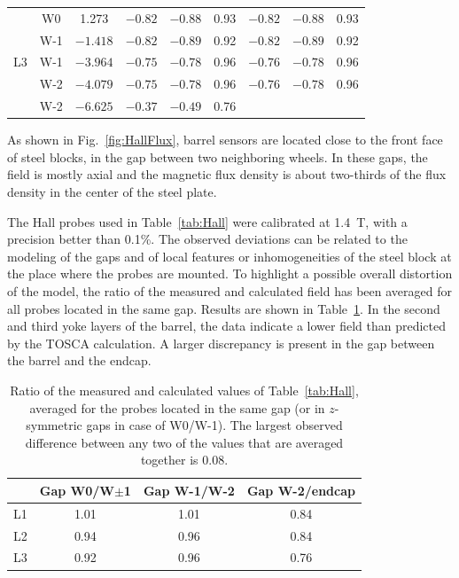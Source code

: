 \begin{table}
\begin{center}
\begin{tabular}{cc|c|ccc|ccc}
\hline
\multirow{5}{*}{L3}
& W0  &  1.273   & $-0.82$ & $-0.88$ & 0.93 & $-0.82$ & $-0.88$ & 0.93 \\
& W-1 & $-1.418$ & $-0.82$ & $-0.89$ & 0.92 & $-0.82$ & $-0.89$ & 0.92 \\
& W-1 & $-3.964$ & $-0.75$ & $-0.78$ & 0.96 & $-0.76$ & $-0.78$ & 0.96 \\
& W-2 & $-4.079$ & $-0.75$ & $-0.78$ & 0.96 & $-0.76$ & $-0.78$ & 0.96 \\
& W-2 & $-6.625$ & $-0.37$ & $-0.49$ & 0.76 & & & \\
\hline

\end{tabular}
\end{center}
\end{table}
As shown in Fig.~\ref{fig:HallFlux}, barrel sensors are located close to
the front face of steel blocks, in the gap between two neighboring wheels.
In these gaps, the field is mostly axial and the magnetic flux density
is about two-thirds of the flux density in the center of the steel plate.

The Hall probes used in Table~\ref{tab:Hall} were calibrated at 1.4~T, with a precision better than 0.1\%.
The observed deviations can be related to the modeling of the
gaps and of local features or inhomogeneities of the steel block at the
place where the probes are mounted. To highlight a possible overall
distortion of the model, the ratio of the measured and calculated field
has been averaged for all probes located in the same gap. Results are
shown in Table~\ref{tab:HallSummary}.
In the second and third yoke layers of the barrel, the data indicate a
lower field than predicted by the TOSCA calculation.
A larger discrepancy is present in the gap between
the barrel and the endcap.

\begin{table}
\begin{center}
\caption{Ratio of the measured and calculated values
  of Table~\ref{tab:Hall}, averaged for the probes located in
  the same gap (or in $z$-symmetric gaps in case of W0/W-1). The
  largest observed difference between any two of the values that are
  averaged together is 0.08.
}
\label{tab:HallSummary}
\vspace{3mm}
\begin{tabular}{l|ccc}
\hline
 & Gap W0/W$\pm$1 & Gap W-1/W-2 & Gap W-2/endcap \\
\hline
L1 & 1.01 & 1.01 & 0.84 \\
L2 & 0.94 & 0.96 & 0.84 \\
L3 & 0.92 & 0.96 & 0.76 \\
\hline
\end{tabular}
\end{center}
\end{table}

